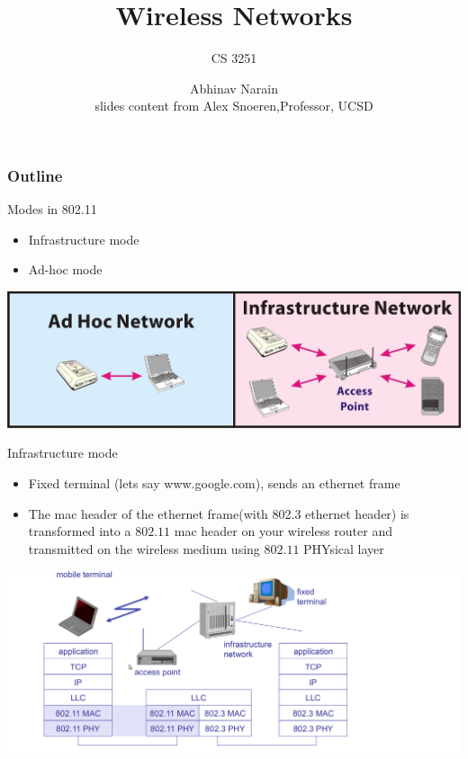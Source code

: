 \documentclass[pdf]{beamer}
\title{Wireless Networks }
\subtitle{CS 3251}
\author[Abhinav Narain]{Abhinav Narain \\
 slides content from Alex Snoeren,Professor, UCSD  }
\institute{Georgia Institute of Technology}
\date{}
\begin{document}
\mode*
\begin{frame}
  \titlepage
\end{frame}

\begin{frame}
  \frametitle{Outline}
  \tableofcontents
\end{frame} 

\begin{frame}{Modes in 802.11}
  \begin{itemize}
   \item Infrastructure mode 
   \item Ad-hoc mode
\end{itemize}
   \begin{center}
       \includegraphics{ad_hoc__infrastructure.jpg}%
   \end{center}
\end{frame} 

\begin{frame}{Infrastructure mode}
  \begin{itemize}
  \item Fixed terminal (lets say www.google.com), sends an ethernet frame
  \item The mac header of the ethernet frame(with 802.3 ethernet header) is transformed into a $802.11$ mac header on your wireless router and transmitted on the wireless medium using $802.11$ PHYsical layer
  \end{itemize}
   \begin{center}
       \includegraphics[scale=.2]{infra.png}%
   \end{center}
\end{frame} 
\end{document}

